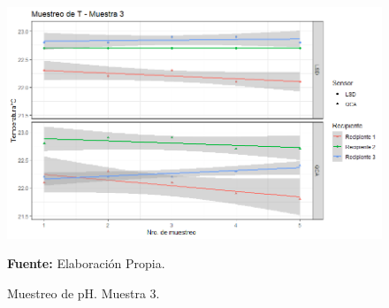     \begin{figure}[H]
        \centering
        \includegraphics[width=0.7\linewidth]{Imagenes/cap4/T_M3.png}
        \caption {Muestreo de pH. Muestra 3. }{\textbf{Fuente:}
        Elaboraci\'on Propia. }
        \label{fig:M3T}
    \end{figure}

